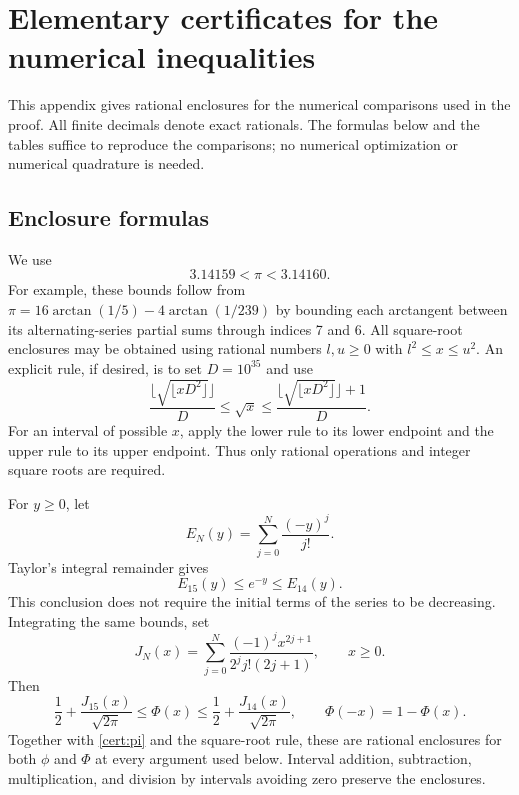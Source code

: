 \section{Elementary certificates for the numerical inequalities}
\label{cert:arithmetic}
This appendix gives rational enclosures for the numerical comparisons
used in the proof. All finite decimals denote exact rationals. The
formulas below and the tables suffice to reproduce the comparisons;
no numerical optimization or numerical quadrature is needed.

\subsection{Enclosure formulas}
We use
\begin{equation}\label{cert:pi}
 3.14159<\pi<3.14160.
\end{equation}
For example, these bounds follow from
\(\pi=16\arctan(1/5)-4\arctan(1/239)\) by bounding each arctangent
between its alternating-series partial sums through indices 7 and 6.
All square-root enclosures may be obtained using rational numbers
\(l,u\ge0\) with \(l^2\le x\le u^2\).
An explicit rule, if desired, is to set \(D=10^{35}\) and use
\[
 \frac{\lfloor\sqrt{\lfloor xD^2\rfloor}\rfloor}{D}
 \le\sqrt{x}\le
 \frac{\lfloor\sqrt{\lfloor xD^2\rfloor}\rfloor+1}{D}.
\]
For an interval of possible \(x\), apply the lower rule to its lower
endpoint and the upper rule to its upper endpoint. Thus only rational
operations and integer square roots are required.

For \(y\ge0\), let
\[
 E_N(y)=\sum_{j=0}^N\frac{(-y)^j}{j!}.
\]
Taylor's integral remainder gives
\begin{equation}\label{cert:exponential}
 E_{15}(y)\le e^{-y}\le E_{14}(y).
\end{equation}
This conclusion does not require the initial terms of the series to
be decreasing. Integrating the same bounds, set
\[
 J_N(x)=\sum_{j=0}^N
 \frac{(-1)^j x^{2j+1}}{2^j j!(2j+1)},\qquad x\ge0.
\]
Then
\begin{equation}\label{cert:normal}
 \frac12+\frac{J_{15}(x)}{\sqrt{2\pi}}
 \le\Phi(x)\le
 \frac12+\frac{J_{14}(x)}{\sqrt{2\pi}},\qquad
 \Phi(-x)=1-\Phi(x).
\end{equation}
Together with \eqref{cert:pi} and the square-root rule, these are
rational enclosures for both \(\phi\) and \(\Phi\) at every argument
used below. Interval addition, subtraction, multiplication, and
division by intervals avoiding zero preserve the enclosures.


